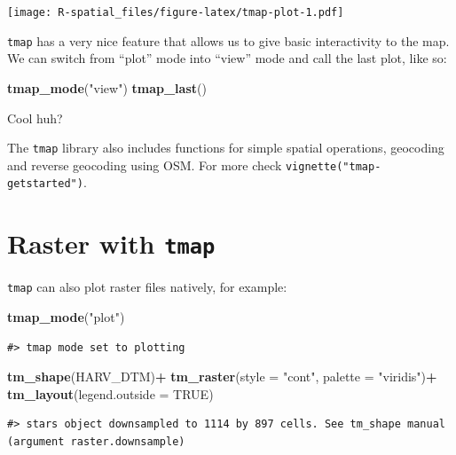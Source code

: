 \documentclass[
]{book}
\newenvironment{Shaded}{\begin{snugshade}}{\end{snugshade}}
\newcommand{\AttributeTok}[1]{\textcolor[rgb]{0.13,0.29,0.53}{#1}}
\newcommand{\ConstantTok}[1]{\textcolor[rgb]{0.56,0.35,0.01}{#1}}
\newcommand{\FunctionTok}[1]{\textcolor[rgb]{0.13,0.29,0.53}{\textbf{#1}}}
\newcommand{\NormalTok}[1]{#1}
\newcommand{\SpecialCharTok}[1]{\textcolor[rgb]{0.81,0.36,0.00}{\textbf{#1}}}
\newcommand{\StringTok}[1]{\textcolor[rgb]{0.31,0.60,0.02}{#1}}
\begin{document}
\texttt{[image: R-spatial\_files/figure-latex/tmap-plot-1.pdf]}

\texttt{tmap} has a very nice feature that allows us to give basic interactivity to the map. We can switch from ``plot'' mode into ``view'' mode and call the last plot, like so:

\begin{Shaded}
\begin{Highlighting}[]
\FunctionTok{tmap\_mode}\NormalTok{(}\StringTok{"view"}\NormalTok{)}
\FunctionTok{tmap\_last}\NormalTok{()}
\end{Highlighting}
\end{Shaded}

Cool huh?

The \texttt{tmap} library also includes functions for simple spatial operations, geocoding and reverse geocoding using OSM. For more check \texttt{vignette("tmap-getstarted")}.

\hypertarget{raster-with-tmap}{%
\section{\texorpdfstring{Raster with \texttt{tmap}}{Raster with tmap}}\label{raster-with-tmap}}

\texttt{tmap} can also plot raster files natively, for example:

\begin{Shaded}
\begin{Highlighting}[]
\FunctionTok{tmap\_mode}\NormalTok{(}\StringTok{"plot"}\NormalTok{)}
\end{Highlighting}
\end{Shaded}

\begin{verbatim}
#> tmap mode set to plotting
\end{verbatim}

\begin{Shaded}
\begin{Highlighting}[]
\FunctionTok{tm\_shape}\NormalTok{(HARV\_DTM)}\SpecialCharTok{+}
    \FunctionTok{tm\_raster}\NormalTok{(}\AttributeTok{style =} \StringTok{"cont"}\NormalTok{, }\AttributeTok{palette =} \StringTok{"viridis"}\NormalTok{)}\SpecialCharTok{+}
    \FunctionTok{tm\_layout}\NormalTok{(}\AttributeTok{legend.outside =} \ConstantTok{TRUE}\NormalTok{)}
\end{Highlighting}
\end{Shaded}

\begin{verbatim}
#> stars object downsampled to 1114 by 897 cells. See tm_shape manual (argument raster.downsample)
\end{verbatim}
\end{document}
